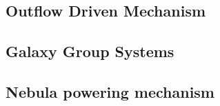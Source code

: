 \documentclass[../main.tex]{subfiles}
\begin{document}
	\subsection{Outflow Driven Mechanism}
	
	\subsection{Galaxy Group Systems}
	
	\subsection{Nebula powering mechanism}
	
\end{document}
